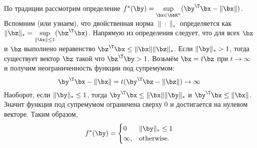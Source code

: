 \documentclass[12pt]{article}
\begin{document}
По традиции рассмотрим определение $f^*(\by) = \sup\limits_{\bx \in \bbR^n} (\by^{\T}\bx - \| \bx\|)$.
Вспомним (или узнаем), что двойственная норма $\|\cdot \|_*$ определяется как $\|\bz\|_* = \sup\limits_{\| \bx \| \leq 1} (\bz^{\T}\bx)$. 
Напрямую из определения следует, что для всех $\bx$ и $\bz$ выполнено неравенство $\bz^{\T}\bx \leq \|\bx\| \|\bz\|_*$.
Если $\|\by\|_* > 1$, тогда существует вектор $\bz$ такой что $\bz^{\T}\by > 1$.
Возьмём $\bx = t\bz$ при $t \rightarrow \infty$ и получим неограниченность функции под супремумом:
\[
\by^{\T}\bx - \| \bx\| = t (\by^{\T}\bz - \|\bz\|) \rightarrow \infty
\] 
Наоборот, если $\|\by\|_* \leq 1$, тогда $\by^{\T}\bx \leq \| \bx \| \| \by \|_*$ и $ \by^{\T}\bx \leq \| \bx \|$. 
Значит функция под супремумом ограничена сверху 0 и достигается на нулевом векторе.
Таким образом,
\[
f^*(\by) = 
\begin{cases}
0 & \|\by\|_* \leq 1\\
\infty, & \text{otherwise}.
\end{cases}
\]
\end{document}
